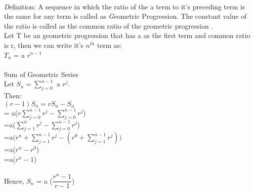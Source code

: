 \documentclass{article}
\begin{document}
 \\
 {\emph Definition:} \hspace{2mm} A sequence in which the ratio of the a term to it's preceding term is the same for any term is called as {\emph Geometric Progression}. 
 The constant value of the ratio is called as the common ratio of the geometric progression .
 \\Let T be an geometric progression that has a as the first term and common ratio is r, then we can write it's $n^{th}$ term as:
 \\$T_{n}$ = a $r^{n-1}$
 \\
 \\
 {\large Sum of Geometric Series } ~\cite{wiki}
 \vspace{0mm}
\\Let $S_n =\displaystyle\sum_{j \mathop = 0}^{n - 1}$ a $r^j$.
\\Then:
\\$(r - 1) S_n =r S_n - S_n$\vspace{1mm}
\\ \hspace*{14mm} = a($r \displaystyle\sum_{j \mathop = 0}^{n - 1} r^j - \displaystyle\sum_{j \mathop = 0}^{n - 1} r^j$)\vspace{1mm}
\\ \hspace*{14mm}  =a($ \displaystyle\sum_{j \mathop = 1}^n r^j - \displaystyle\sum_{j \mathop = 0}^{n - 1} r^j $\vspace{1mm})
\\ \hspace*{14mm}  =a$ \Bigg(r^n + \displaystyle\sum_{j \mathop = 1}^{n-1} r^j - \left({r^0 + \displaystyle\sum_{j \mathop = 1}^{n - 1} r^j}\right) \Bigg) $ \vspace{1mm}
\\ \hspace*{14mm}  =a($r^n - r^0$) \vspace{1mm}
\\ \hspace*{14mm}  =a($r^n - 1 $)\vspace{1mm}
\\
\\ Hence, $S_n$ = a ($\dfrac{r^n -1}{r-1}$)
\vspace{5mm}
{}

\end{document}
